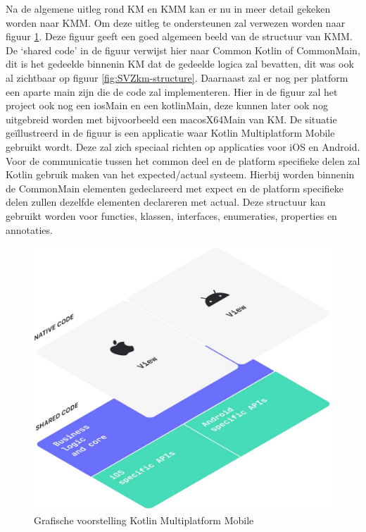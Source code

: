 Na de algemene uitleg rond KM en KMM kan er nu in meer detail gekeken worden naar KMM. Om deze uitleg te ondersteunen zal verwezen worden naar figuur \ref{fig:SVZkmm}. Deze figuur geeft een goed algemeen beeld van de structuur van KMM. De ‘shared code’ in de figuur verwijst hier naar Common Kotlin of CommonMain, dit is het gedeelde binnenin KM dat de gedeelde logica zal bevatten, dit was ook al zichtbaar op figuur \ref{fig:SVZkm-structure}. Daarnaast zal er nog per platform een aparte main zijn die de code zal implementeren. Hier in de figuur zal het project ook nog een iosMain en een kotlinMain, deze kunnen later ook nog uitgebreid worden met bijvoorbeeld een macosX64Main van KM. De situatie geïllustreerd in de figuur is een applicatie waar Kotlin Multiplatform Mobile gebruikt wordt. Deze zal zich speciaal richten op applicaties voor iOS en Android. Voor de communicatie tussen het common deel en de platform specifieke delen zal Kotlin gebruik maken van het expected/actual systeem. Hierbij worden binnenin de CommonMain elementen gedeclareerd met expect en de platform specifieke delen zullen dezelfde elementen declareren met actual. Deze structuur kan gebruikt worden voor functies, klassen, interfaces, enumeraties, properties en annotaties. 

\begin{figure}[h!]
    \includegraphics[width=\linewidth]{img/kmm.jpg}
    \caption{Grafische voorstelling Kotlin Multiplatform Mobile \autocite{KotlinKMM}}
    \label{fig:SVZkmm}
\end{figure}

